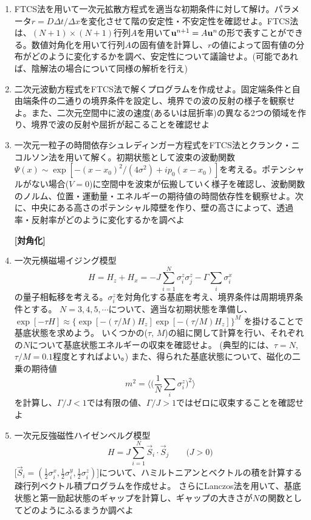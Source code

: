 \documentclass[11pt]{jarticle}
\begin{document}
\begin{enumerate}
\hspace*{-2em} {\bf [偏微分方程式]}

\item FTCS法を用いて一次元拡散方程式を適当な初期条件に対して解け。パラメータ$r=D\Delta t / \Delta x$を変化させて階の安定性・不安定性を確認せよ。FTCS法は、$(N+1) \times (N+1)$行列$A$を用いて${\bf u}^{n+1} = A {\bf u}^n$の形で表すことができる。数値対角化を用いて行列$A$の固有値を計算し、$r$の値によって固有値の分布がどのように変化するかを調べ、安定性について議論せよ。(可能であれば、陰解法の場合について同様の解析を行え)

\item 二次元波動方程式をFTCS法で解くプログラムを作成せよ。固定端条件と自由端条件の二通りの境界条件を設定し、境界での波の反射の様子を観察せよ。また、二次元空間中に波の速度(あるいは屈折率)の異なる2つの領域を作り、境界で波の反射や屈折が起こることを確認せよ

\item 一次元一粒子の時間依存シュレディンガー方程式をFTCS法とクランク・ニコルソン法を用いて解く。初期状態として波束の波動関数$\Psi(x) \sim \exp [-(x-x_0)^2/(4\sigma^2) + i p_0(x-x_0)]$を考える。ポテンシャルがない場合($V=0$)に空間中を波束が伝搬していく様子を確認し、波動関数のノルム、位置・運動量・エネルギーの期待値の時間依存性を観察せよ。次に、中央にある高さのポテンシャル障壁を作り、壁の高さによって、透過率・反射率がどのように変化するかを調べよ
  
\hspace*{-2em} {\bf [対角化]}

\item 一次元横磁場イジング模型
  \[
  H = H_z + H_x = - J\sum_{i=1}^N \sigma_i^z \sigma_j^z - \Gamma \sum_i \sigma_i^x
  \]
  の量子相転移を考える。$\sigma_i^z$を対角化する基底を考え、境界条件は周期境界条件とする。
  $N=3,4,5,\cdots$について、適当な初期状態を準備し、$\exp[-\tau H] \approx \{ \exp[-(\tau/M) H_z] \exp[-(\tau/M) H_z] \}^M$ を掛けることで基底状態を求めよう。
  いくつかの($\tau$, $M$)の組に関して計算を行い、それぞれの$N$について基底状態エネルギーの収束を確認せよ。
  (典型的には、$\tau=N$, $\tau / M = 0.1$程度とすればよい。)
  また、得られた基底状態について、磁化の二乗の期待値
  \[
  m^2 = \langle \Big( \frac{1}{N} \sum_i \sigma_i^z \Big)^2 \rangle
  \]
  を計算し、$\Gamma/J < 1$では有限の値、$\Gamma/J > 1$ではゼロに収束することを確認せよ

\item 一次元反強磁性ハイゼンベルグ模型
  \[
  H = J\sum_{i=1}^N \vec{S}_i \cdot \vec{S}_j \qquad \text{($J>0$)}
  \]
  [$\vec{S}_i = (\frac{1}{2} \sigma_i^x, \frac{1}{2} \sigma_i^y, \frac{1}{2} \sigma_i^z)$]について、ハミルトニアンとベクトルの積を計算する疎行列ベクトル積プログラムを作成せよ。
  さらにLanczos法を用いて、基底状態と第一励起状態のギャップを計算し、ギャップの大きさが$N$の関数としてどのようにふるまうか調べよ


\end{enumerate}
\end{document}
